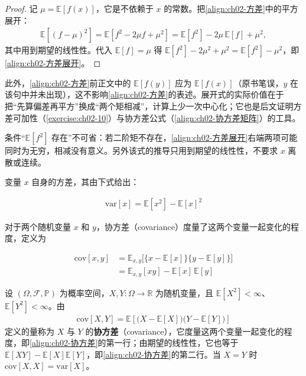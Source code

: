 \documentclass[../../main.tex]{subfiles}
\begin{document}
\begin{proof}
记 $\mu=\mathbb{E}[f(x)]$，它是不依赖于 $x$ 的常数。把\eqref{align:ch02-方差}中的平方展开：
\begin{align*}
 \mathbb{E}\left[(f-\mu)^2\right] = \mathbb{E}\left[f^2 - 2\mu f + \mu^2\right] = \mathbb{E}[f^2] - 2\mu\,\mathbb{E}[f] + \mu^2 ,
\end{align*}
其中用到期望的线性性。代入 $\mathbb{E}[f]=\mu$ 得 $\mathbb{E}[f^2]-2\mu^2+\mu^2 = \mathbb{E}[f^2]-\mu^2$，即\eqref{align:ch02-方差展开}。
\end{proof}

\begin{remark}
此外，\eqref{align:ch02-方差}前正文中的 $\mathbb{E}[f(y)]$ 应为 $\mathbb{E}[f(x)]$（原书笔误，$y$ 在该句中并未出现），这不影响\eqref{align:ch02-方差}的表述。展开式的实际价值在于把“先算偏差再平方”换成“两个矩相减”，计算上少一次中心化；它也是后文证明方差可加性（\cref{exercise:ch02-10}）与协方差公式（\eqref{align:ch02-协方差矩阵}）的工具。

条件“$\mathbb{E}[f^2]$ 存在”不可省：若二阶矩不存在，\eqref{align:ch02-方差展开}右端两项可能同时为无穷，相减没有意义。另外该式的推导只用到期望的线性性，不要求 $x$ 离散或连续。
\end{remark}

变量 $x$ 自身的方差，其由下式给出：

\begin{align}
  \mathrm{var}[x] = \mathbb{E}\left[x^{2}\right] - \mathbb{E}[x]^{2}
  \label{align:ch02-变量方差}
\end{align}

对于两个随机变量 $x$ 和 $y$，协方差（covariance）度量了这两个变量一起变化的程度，定义为

\begin{align}
  \mathrm{cov}[x,y] &= \mathbb{E}_{x,y}\big[\{x-\mathbb{E}[x]\}\{y-\mathbb{E}[y]\}\big] \nonumber \\
  &= \mathbb{E}_{x,y}[xy] - \mathbb{E}[x]\,\mathbb{E}[y]
  \label{align:ch02-协方差}
\end{align}

\begin{definition}[协方差]\label{definition:ch02-协方差}
设 $(\Omega,\mathcal{F},\mathbb{P})$ 为概率空间，$X,Y:\Omega\to\mathbb{R}$ 为随机变量，且 $\mathbb{E}[X^{2}]<\infty$、$\mathbb{E}[Y^{2}]<\infty$。由
\begin{align*}
  \mathrm{cov}[X,Y]=\mathbb{E}\left[\big(X-\mathbb{E}[X]\big)\big(Y-\mathbb{E}[Y]\big)\right]
\end{align*}
定义的量称为 $X$ 与 $Y$ 的\textbf{协方差}（covariance），它度量这两个变量一起变化的程度，即\eqref{align:ch02-协方差}的第一行；由期望的线性性，它也等于 $\mathbb{E}[XY]-\mathbb{E}[X]\mathbb{E}[Y]$，即\eqref{align:ch02-协方差}的第二行。当 $X=Y$ 时 $\mathrm{cov}[X,X]=\mathrm{var}[X]$。
\end{definition}
\end{document}

